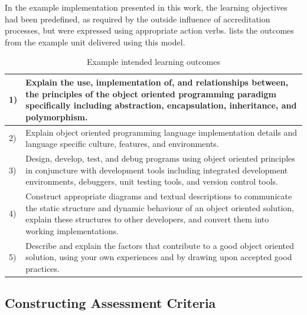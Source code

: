 In the example implementation presented in this work, the learning objectives had been predefined, as required by the outside influence of accreditation processes, but were expressed using appropriate action verbs.  lists the outcomes from the example unit delivered using this model.

\begin{table}[!t]
  \footnotesize
\renewcommand{\arraystretch}{1.3}
\caption{Example intended learning outcomes}
\label{tbl:example_intended_learning_outcomes}
\centering
\begin{tabular}{|l p{6.25in}|}
\hline
1) & Explain the use, implementation of, and relationships between, the principles of the object oriented programming paradigm specifically including abstraction, encapsulation, inheritance, and polymorphism.
\\
\hline
2) & Explain object oriented programming language implementation details and language specific culture, features, and environments.
\\
\hline
3) & Design, develop, test, and debug programs using object oriented principles in conjuncture with development tools including integrated development environments, debuggers, unit testing tools, and version control tools. \\
\hline
4) & Construct appropriate diagrams and textual descriptions to communicate the static structure and dynamic behaviour of an object oriented solution, explain these structures to other developers, and convert them into working implementations.\\
\hline
5) & Describe and explain the factors that contribute to a good object oriented solution, using your own experiences and by drawing upon accepted good practices. \\
\hline
\end{tabular}
\end{table}







\subsection{Constructing Assessment Criteria} %
\label{sub:constructing_assessment_criteria}

